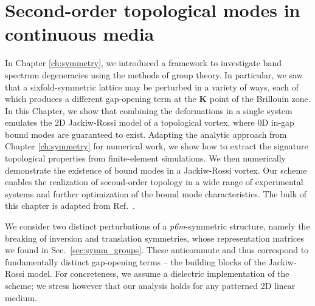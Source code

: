 

\chapter{Second-order topological modes in continuous media} \label{ch:hoti} 


\begin{chapterabstract}
	In Chapter \ref{ch:symmetry}, we introduced a framework to investigate band spectrum degeneracies using the methods of group theory.	
	In particular, we saw that a sixfold-symmetric lattice may be perturbed in a variety of ways, each of which produces a different gap-opening term at the $\boldsymbol{K}$ point of the Brillouin zone. In this Chapter, we show that combining the deformations in a single system emulates the 2D Jackiw-Rossi model of a topological vortex, where 0D in-gap bound modes are guaranteed to exist. Adapting the analytic approach from Chapter \ref{ch:symmetry} for numerical work, we show how to extract the signature topological properties from finite-element simulations. We then numerically demonstrate the existence of bound modes in a Jackiw-Rossi vortex. Our scheme enables the realization of second-order topology in a wide range of experimental systems and further optimization of the bound mode characteristics. 
	\tcblower
	The bulk of this chapter is adapted from Ref.~\cite{Kosata_2021}.
\end{chapterabstract}

We consider two distinct perturbations of a \textit{p6m}-symmetric structure, namely the breaking of inversion and translation symmetries, whose representation matrices we found in Sec.~\ref{sec:symm_groups}. These anticommute and thus correspond to fundamentally distinct gap-opening terms -- the building blocks of the Jackiw-Rossi model. For concreteness, we assume a dielectric implementation of the scheme; we stress however that our analysis holds for any patterned 2D linear medium. 

